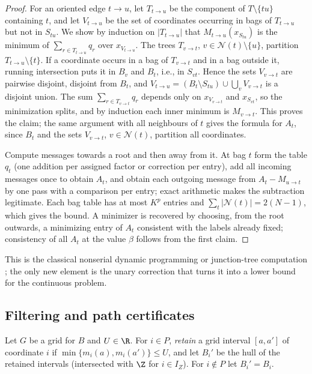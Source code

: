 \begin{proof}
For an oriented edge $t\to u$, let $T_{t\to u}$ be the component of
$T\setminus\{tu\}$ containing $t$, and let $V_{t\to u}$ be the set of
coordinates occurring in bags of $T_{t\to u}$ but not in $S_{tu}$. We show by
induction on $|T_{t\to u}|$ that $M_{t\to u}(x_{S_{tu}})$ is the minimum of
$\sum_{r\in T_{t\to u}}q_r$ over $x_{V_{t\to u}}$. The trees $T_{v\to t}$,
$v\in\mathcal N(t)\setminus\{u\}$, partition $T_{t\to u}\setminus\{t\}$. If a
coordinate occurs in a bag of $T_{v\to t}$ and in a bag outside it, running
intersection puts it in $B_v$ and $B_t$, i.e., in $S_{vt}$. Hence the sets
$V_{v\to t}$ are pairwise disjoint, disjoint from $B_t$, and
$V_{t\to u}=(B_t\setminus S_{tu})\cup\bigcup_vV_{v\to t}$ is a disjoint union.
The sum $\sum_{r\in T_{v\to t}}q_r$ depends only on $x_{V_{v\to t}}$ and
$x_{S_{vt}}$, so the minimization splits, and by induction each inner minimum
is $M_{v\to t}$. This proves the claim; the same argument with all neighbours
of $t$ gives the formula for $A_t$, since $B_t$ and the sets $V_{v\to t}$,
$v\in\mathcal N(t)$, partition all coordinates.

Compute messages towards a root and then away from it. At bag $t$ form the
table $q_t$ (one addition per assigned factor or correction per entry), add
all incoming messages once to obtain $A_t$, and obtain each outgoing message
from $A_t-M_{u\to t}$ by one pass with a comparison per entry; exact
arithmetic makes the subtraction legitimate. Each bag table has at most $K^p$
entries and $\sum_t|\mathcal N(t)|=2(N-1)$, which gives the bound. A minimizer
is recovered by choosing, from the root outwards, a minimizing entry of $A_t$
consistent with the labels already fixed; consistency of all $A_t$ at the value
$\beta$ follows from the first claim.
\end{proof}

This is the classical nonserial dynamic programming or junction-tree
computation \cite{BerteleBrioschi1972,Dechter1999}; the only new element is
the unary correction that turns it into a lower bound for the continuous
problem.

\subsection{Filtering and path certificates}\label{core:sec:filter}

\begin{definition}\label{core:def:filter}
Let $G$ be a grid for $B$ and $U\in\R$. For $i\in P$, \emph{retain} a grid
interval $[a,a']$ of coordinate $i$ if $\min\{m_i(a),m_i(a')\}\le U$, and let
$B_i'$ be the hull of the retained intervals (intersected with $\Z$ for
$i\in I_Z$). For $i\notin P$ let $B_i'=B_i$.
\end{definition}

